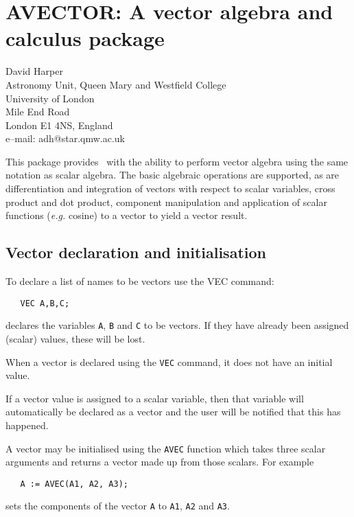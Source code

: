 \chapter[AVECTOR: Vector Algebra]%
	{AVECTOR: A vector algebra and calculus package}
\label{AVECTOR}

{\footnotesize
\begin{center}
David Harper \\
Astronomy Unit, Queen Mary and Westfield College \\
University of London \\
Mile End Road \\
London E1 4NS, England \\[0.05in]
e--mail: adh@star.qmw.ac.uk
\end{center}
}

This package provides \REDUCE\ with the ability to perform vector
algebra using the same notation as scalar algebra.  The basic
algebraic operations are supported, as are differentiation and
integration of vectors with respect to scalar variables, cross product
and dot product, component manipulation and application of scalar
functions ({\em e.g.} cosine) to a vector to yield a vector result.

\section{Vector declaration and initialisation}

To declare a list of names to be vectors use the VEC command:
\begin{verbatim}
   VEC A,B,C;
\end{verbatim}
declares the variables {\tt A}, {\tt B} and {\tt C} to be vectors.
If they have already been assigned (scalar) values, these will be lost.

When a vector is declared using the {\tt VEC} command, it does not
have an initial value.

If a vector value is assigned to a scalar variable, then that
variable will automatically be declared as a vector and the
user will be notified that this has happened.

A vector may be initialised using the {\tt AVEC} function which
takes three scalar arguments and returns a vector made up
from those scalars. For example
\begin{verbatim}
   A := AVEC(A1, A2, A3);
\end{verbatim}
sets the components of the vector {\tt A} to {\tt A1}, {\tt A2} and
{\tt A3}.

